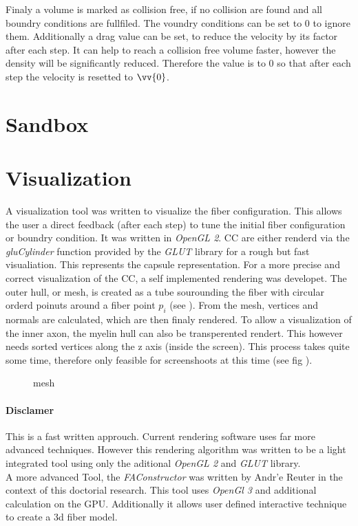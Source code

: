 % 
Finaly a volume is marked as collision free, if no collision are found and all boundry conditions are fullfiled. 
The voundry conditions can be set to 0 to ignore them.
Additionally a drag value can be set, to reduce the velocity by its factor after each step.
It can help to reach a collision free volume faster, however the density will be significantly reduced.
Therefore the value is to 0 so that after each step the velocity is resetted to $\vv{0}$. 
% 
%
% 
% 
\section{Sandbox}
% 
\section{Visualization}
% 
A visualization tool was written to visualize the fiber configuration. This allows the user a direct feedback (\eg after each step) to tune the initial fiber configuration or boundry condition. It was written in \textit{OpenGL 2}.
% 
\ac{CC} are either renderd via the \textit{gluCylinder} function provided by the \textit{GLUT} library for a rough but fast visualiation. This represents the capsule representation. For a more precise and correct visualization of the \ac{CC}, a self implemented rendering was developet. The outer hull, or mesh, is created as a tube sourounding the fiber with circular orderd poinuts around a fiber point $p_i$ (see \dummy).
% 
From the mesh, vertices and normals are calculated, which are then finaly rendered. To allow a visualization of the inner axon, the myelin hull can also be transperented rendert. This however needs sorted vertices along the z axis (inside the screen). This process takes quite some time, therefore only feasible for screenshoots at this time (see fig \dummy).
% 
\begin{figure}[!tb]
    \def\tikzwidth{\textwidth}
	\caption{mesh}
	\label{fig:vis_mesh}
\end{figure}
% 
\paragraph{Disclamer}
This is a fast written approuch. Current rendering software uses far more advanced techniques. However this rendering algorithm was written to be a light integrated tool using only the aditional \textit{OpenGL 2} and \textit{GLUT} library.\\
% 
A more advanced Tool, the \textit{FAConstructor} \cite{Reuter2019} was written by Andr'e Reuter in the context of this doctorial research. This tool uses \textit{OpenGl 3} and additional calculation on the GPU. Additionally it allows user defined interactive technique to create a 3d fiber model.
%  
% 
% 
% 
